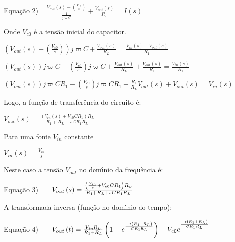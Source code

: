 \documentclass{article}
\begin{document}
\vspace{1pt}

Equa\c{c}\~{a}o 2) $\ \ \ \ \frac{V_{out}\left( s\right) -\left( \frac{V_{c0}%
}{s}\right) }{\frac{1}{j\varpi C}}+\frac{V_{out}\left( s\right) }{R_{L}}%
=I\left( s\right) $

\vspace{1pt}

Onde $V_{c0}$ \'{e} a tens\~{a}o inicial do capacitor.

\vspace{1pt}

$\left( V_{out}\left( s\right) -\left( \frac{V_{c0}}{s}\right) \right)
j\varpi C+\frac{V_{out}\left( s\right) }{R_{L}}=\frac{V_{in}\left( s\right)
-V_{out}\left( s\right) }{R_{1}}$

$\left( V_{out}\left( s\right) \right) j\varpi C-\left( \frac{V_{c0}}{s}%
\right) j\varpi C+\frac{V_{out}\left( s\right) }{R_{L}}+\frac{V_{out}\left(
s\right) }{R_{1}}=\frac{V_{in}\left( s\right) }{R_{1}}$

$\left( V_{out}\left( s\right) \right) j\varpi CR_{1}-\left( \frac{V_{c0}}{s}%
\right) j\varpi CR_{1}+\frac{R_{1}}{R_{L}}V_{out}\left( s\right)
+V_{out}\left( s\right) =V_{in}\left( s\right) $

\vspace{1pt}

Logo, a fun\c{c}\~{a}o de transfer\^{e}ncia do circuito \'{e}:

$V_{out}\left( s\right) =\frac{\left( V_{in}\left( s\right)
+V_{c0}CR_{1}\right) R_{L}}{R_{1}+R_{L}+sCR_{1}R_{L}}$

Para uma fonte $V_{in}$ constante:

$V_{in}\left( s\right) =\frac{V_{in}}{s}$

\vspace{1pt}

Neste caso a tens\~{a}o $V_{out}$ no dom\'{\i}nio da frequ\^{e}ncia \'{e}:

\vspace{1pt}

Equa\c{c}\~{a}o 3)$\qquad V_{out}\left( s\right) =\frac{\left( \frac{V_{in}}{%
s}+V_{c0}CR_{1}\right) R_{L}}{R_{1}+R_{L}+sCR_{1}R_{L}}$

\vspace{1pt}

A transformada inversa (fun\c{c}\~{a}o no dom\'{\i}nio do tempo):

Equa\c{c}\~{a}o 4)$\qquad V_{out}\left( t\right) =\frac{V_{in}R_{L}}{%
R_{1}+R_{L}}\left( 1-e^{\frac{-t\left( R_{1}+R_{L}\right) }{CR_{1}R_{L}}%
}\right) +V_{c0}e^{^{\frac{-t\left( R_{1}+R_{L}\right) }{CR_{1}R_{L}}}}$
\end{document}
